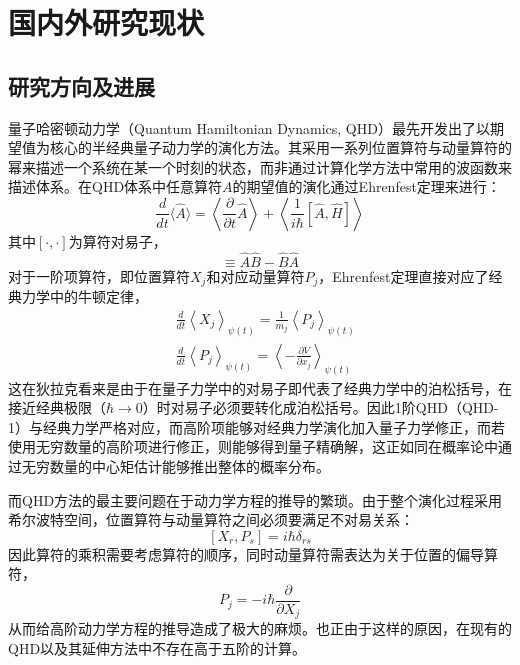 \section{国内外研究现状}

\subsection{研究方向及进展}
量子哈密顿动力学（Quantum Hamiltonian Dynamics, QHD）最先开发出了以期望值为核心的半经典量子动力学的演化方法\cite{OlegQHD}。其采用一系列位置算符与动量算符的幂来描述一个系统在某一个时刻的状态，而非通过计算化学方法中常用的波函数来描述体系。在QHD体系中任意算符$A$的期望值的演化通过Ehrenfest定理来进行：
\begin{equation}
	\frac{d}{d t}\langle\hat{A}\rangle=\left\langle\frac{\partial}{\partial t} \hat{A}\right\rangle+\left\langle\frac{1}{i \hbar}[\hat{A}, \hat{H}]\right\rangle
\end{equation}
其中$[\cdot, \cdot]$为算符对易子，
\begin{equation}
	[\hat{A}, \hat{B}] \equiv \hat{A}\hat{B} - \hat{B} \hat{A}
\end{equation}
对于一阶项算符，即位置算符$X_j$和对应动量算符$P_j$，Ehrenfest定理直接对应了经典力学中的牛顿定律，
\begin{equation}
\begin{aligned}
&\frac{d}{d t}\left\langle X_{j}\right\rangle_{\psi(t)}=\frac{1}{m_{j}}\left\langle P_{j}\right\rangle_{\psi(t)}\\
&\frac{d}{d t}\left\langle P_{j}\right\rangle_{\psi(t)}=\left\langle-\frac{\partial V}{\partial x_{j}}\right\rangle_{\psi(t)}
\end{aligned}
\end{equation}
这在狄拉克看来是由于在量子力学中的对易子即代表了经典力学中的泊松括号，在接近经典极限（$\hbar \rightarrow 0$）时对易子必须要转化成泊松括号\cite{dirac1981principles}。因此1阶QHD（QHD-1）与经典力学严格对应，而高阶项能够对经典力学演化加入量子力学修正，而若使用无穷数量的高阶项进行修正，则能够得到量子精确解，这正如同在概率论中通过无穷数量的中心矩估计能够推出整体的概率分布\cite{fisz2018probability}。

而QHD方法的最主要问题在于动力学方程的推导的繁琐。由于整个演化过程采用希尔波特空间，位置算符与动量算符之间必须要满足不对易关系：
\begin{equation}
	\left[X_{r}, P_{s}\right]= i\hbar \delta_{r s}
\end{equation}
因此算符的乘积需要考虑算符的顺序，同时动量算符需表达为关于位置的偏导算符，
\begin{equation}
	P_j = - i \hbar \frac{\partial}{\partial X_j}
\end{equation}
从而给高阶动力学方程的推导造成了极大的麻烦。也正由于这样的原因，在现有的QHD以及其延伸方法中不存在高于五阶的计算。

